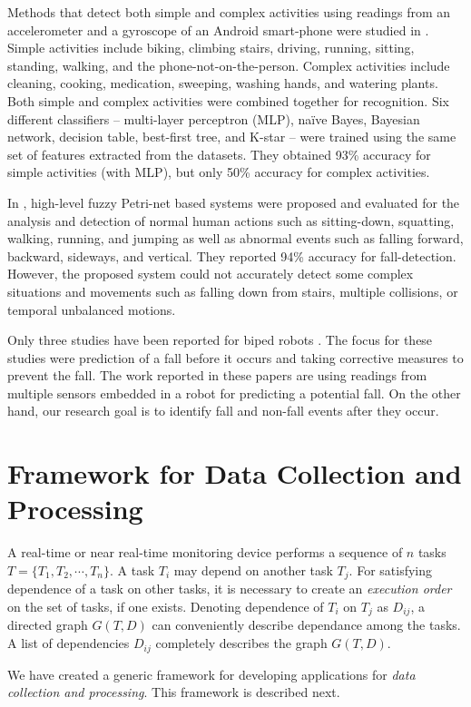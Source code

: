 \documentclass[]{IEEEtran}
\begin{document}
Methods that detect both simple and complex activities using readings from
an accelerometer and a gyroscope of an Android smart-phone were studied
in \cite{DernbachActivityAndFallDetectionPhone2012}. Simple activities
include biking, climbing stairs, driving, running, sitting, standing,
walking, and the phone-not-on-the-person. Complex activities include
cleaning, cooking, medication, sweeping, washing hands, and watering plants. Both
simple and complex activities were combined together for recognition. Six different classifiers 
-- multi-layer  perceptron (MLP), na\"{i}ve  Bayes,  Bayesian  network,  decision
table,  best-first tree, and  K-star --  were trained using  the same set of
features extracted from the datasets. They obtained 93\% accuracy for simple
activities (with MLP), but only 50\% accuracy for complex activities.    

In \cite{ShenFallDetectionPhone2015}, high-level fuzzy Petri-net based systems
were proposed and evaluated for the analysis and detection of normal human
actions such as sitting-down, squatting, walking, running, and jumping as well
as abnormal events such as falling forward, backward, sideways, and vertical.
They reported 94\% accuracy for fall-detection. However, the proposed system  could
not accurately detect some complex situations and movements  such as falling
down from  stairs, multiple collisions, or temporal unbalanced motions.

\par Only three studies have been reported for biped robots
\cite{Andre2015,Goswami2014,Moya2015}. The focus for these studies
were prediction of a fall before it occurs and taking corrective measures to
prevent the fall. The work reported in these papers are using readings from
multiple sensors embedded in a robot for predicting a potential fall. On the
other hand, our research goal is to identify  fall and non-fall events  after
they occur.

\section{Framework for Data Collection and Processing}
\label{sec:framework}

A real-time or near real-time monitoring device performs a sequence of $n$
tasks $T = \{ T_1, T_2,\cdots,T_n\}$. A task $T_i$ may depend on another task
$T_j$.  For satisfying dependence of a task on other tasks, it is necessary to
create an \emph{execution order} on the set of tasks, if one exists. Denoting
dependence of $T_i$ on $T_j$ as $D_{ij}$, a directed graph $G(T,D)$ can
conveniently describe dependance among the tasks. A list of dependencies
$D_{ij}$ completely describes the graph $G(T,D)$.  \par We have created a
generic framework for developing applications for \emph{data collection and
processing}. This framework is described next.
\end{document}
